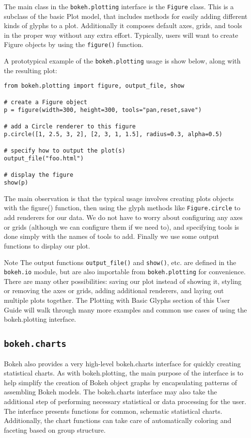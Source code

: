 The main class in the \texttt{bokeh.plotting} interface is the \texttt{Figure} class. This is a subclass of the basic Plot model, that includes methods for easily adding different kinds of glyphs to a plot. Additionally it composes default axes, grids, and tools in the proper way without any extra effort. Typically, users will want to create Figure objects by using the \texttt{figure()} function.

A prototypical example of the \texttt{bokeh.plotting} usage is show below, along with the resulting plot:

\begin{framed}
\begin{verbatim}
from bokeh.plotting import figure, output_file, show

# create a Figure object
p = figure(width=300, height=300, tools="pan,reset,save")

# add a Circle renderer to this figure
p.circle([1, 2.5, 3, 2], [2, 3, 1, 1.5], radius=0.3, alpha=0.5)

# specify how to output the plot(s)
output_file("foo.html")

# display the figure
show(p)
\end{verbatim}
\end{framed}
The main observation is that the typical usage involves creating plots objects with the figure() function, then using the glyph methods like \texttt{Figure.circle} to add renderers for our data. We do not have to worry about configuring any axes or grids (although we can configure them if we need to), and specifying tools is done simply with the names of tools to add. Finally we use some output functions to display our plot.

Note
The output functions \texttt{output\_file()} and \texttt{show()}, etc. are defined in the \texttt{bokeh.io} module, but are also importable from \texttt{bokeh.plotting} for convenience.
There are many other possibilities: saving our plot instead of showing it, styling or removing the axes or grids, adding additional renderers, and laying out multiple plots together. The Plotting with Basic Glyphs section of this User Guide will walk through many more examples and common use cases of using the bokeh.plotting interface.

\subsection{\texttt{bokeh.charts}}
Bokeh also provides a very high-level bokeh.charts interface for quickly creating statistical charts. As with bokeh.plotting, the main purpose of the interface is to help simplify the creation of Bokeh object graphs by encapsulating patterns of assembling Bokeh models. The bokeh.charts interface may also take the additional step of performing necessary statistical or data processing for the user. The interface presents functions for common, schematic statistical charts. Additionally, the chart functions can take care of automatically coloring and faceting based on group structure.
